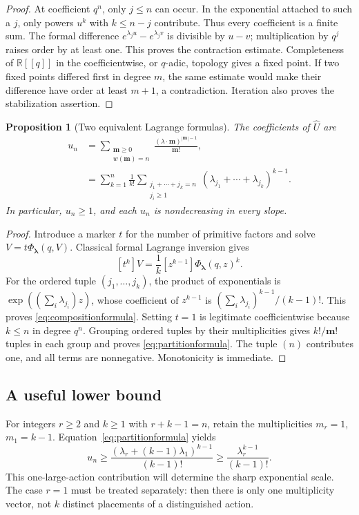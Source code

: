 \documentclass[11pt,a4paper]{article}
\numberwithin{equation}{section}
\newtheorem{proposition}[theorem]{Proposition}
\theoremstyle{definition}
\theoremstyle{remark}
\newcommand{\R}{\mathbb R}
\newcommand{\lam}{\boldsymbol\lambda}
\newcommand{\mm}{\boldsymbol m}
\newcommand{\PhiL}{\Phi_{\lam}}
\newcommand{\Uhat}{\widehat U}
\begin{document}
\begin{proof}
At coefficient $q^n$, only $j\le n$ can occur.  In the exponential attached
to such a $j$, only powers $u^k$ with $k\le n-j$ contribute.  Thus every
coefficient is a finite sum.  The formal difference
$e^{\lambda_j u}-e^{\lambda_j v}$ is divisible by $u-v$; multiplication by
$q^j$ raises order by at least one.  This proves the contraction estimate.
Completeness of $\R[[q]]$ in the coefficientwise, or $q$-adic, topology gives
a fixed point.  If two fixed points differed first in degree $m$, the same
estimate would make their difference have order at least $m+1$, a
contradiction.  Iteration also proves the stabilization assertion.
\end{proof}

\begin{proposition}[Two equivalent Lagrange formulas]
\label{prop:coefficients}
The coefficients of $\Uhat$ are
\begin{align}
 u_n
 &=\sum_{\substack{\mm\ge0\\w(\mm)=n}}
       \frac{(\lambda\cdot\mm)^{|\mm|-1}}{\mm!},
 \label{eq:partitionformula}\\
 &=\sum_{k=1}^n\frac1{k!}
       \sum_{\substack{j_1+\cdots+j_k=n\\j_i\ge1}}
       (\lambda_{j_1}+\cdots+\lambda_{j_k})^{k-1}.
 \label{eq:compositionformula}
\end{align}
In particular, $u_n\ge1$, and each $u_n$ is nondecreasing in every slope.
\end{proposition}

\begin{proof}
Introduce a marker $t$ for the number of primitive factors and solve
$V=t\PhiL(q,V)$.  Classical formal Lagrange inversion \cite{gessel} gives
\[
 [t^k]V=\frac1k[z^{k-1}]\PhiL(q,z)^k.
\]
For the ordered tuple $(j_1,\ldots,j_k)$, the product of exponentials is
$\exp((\sum_i\lambda_{j_i})z)$, whose coefficient of $z^{k-1}$ is
$(\sum_i\lambda_{j_i})^{k-1}/(k-1)!$.  This proves
\eqref{eq:compositionformula}.  Setting $t=1$ is legitimate coefficientwise
because $k\le n$ in degree $q^n$.  Grouping ordered tuples by their
multiplicities gives $k!/\mm!$ tuples in each group and proves
\eqref{eq:partitionformula}.  The tuple $(n)$ contributes one, and all
terms are nonnegative.  Monotonicity is immediate.
\end{proof}

\subsection{A useful lower bound}
For integers $r\ge2$ and $k\ge1$ with $r+k-1=n$, retain the multiplicities
$m_r=1$, $m_1=k-1$.  Equation~\eqref{eq:partitionformula} yields
\begin{equation}
 u_n\ge
 \frac{(\lambda_r+(k-1)\lambda_1)^{k-1}}{(k-1)!}
 \ge\frac{\lambda_r^{k-1}}{(k-1)!}.
 \label{eq:singlelarge}
\end{equation}
This one-large-action contribution will determine the sharp exponential
scale.  The case $r=1$ must be treated separately: then there is only one
multiplicity vector, not $k$ distinct placements of a distinguished action.
\end{document}

